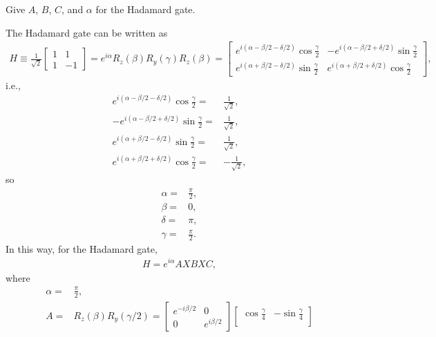 \documentclass[en]{sol-man}
\begin{document}
\begin{exe}
    Give $A$, $B$, $C$, and $\alpha$ for the Hadamard gate.
\end{exe}
\begin{sol}
    The Hadamard gate can be written as
    \begin{align}
        H\equiv\frac{1}{\sqrt{2}}\begin{bmatrix}
            1&1\\
            1&-1
        \end{bmatrix}=e^{i\alpha}R_z(\beta)R_y(\gamma)R_z(\beta)=\begin{bmatrix}
            e^{i(\alpha-\beta/2-\delta/2)}\cos\frac{\gamma}{2}&-e^{i(\alpha-\beta/2+\delta/2)}\sin\frac{\gamma}{2}\\
            e^{i(\alpha+\beta/2-\delta/2)}\sin\frac{\gamma}{2}&e^{i(\alpha+\beta/2+\delta/2)}\cos\frac{\gamma}{2}
        \end{bmatrix},
    \end{align}
    i.e.,
    \begin{align}
        e^{i(\alpha-\beta/2-\delta/2)}\cos\frac{\gamma}{2}=&\frac{1}{\sqrt{2}},\\
        -e^{i(\alpha-\beta/2+\delta/2)}\sin\frac{\gamma}{2}=&\frac{1}{\sqrt{2}},\\
        e^{i(\alpha+\beta/2-\delta/2)}\sin\frac{\gamma}{2}=&\frac{1}{\sqrt{2}},\\
        e^{i(\alpha+\beta/2+\delta/2)}\cos\frac{\gamma}{2}=&-\frac{1}{\sqrt{2}},
    \end{align}
    so
    \begin{align}
        \alpha=&\frac{\pi}{2},\\
        \beta=&0,\\
        \delta=&\pi,\\
        \gamma=&\frac{\pi}{2}.
    \end{align}
    In this way, for the Hadamard gate,
    \begin{align}
        H=e^{i\alpha}AXBXC,
    \end{align}
    where
    \begin{align}
        \alpha=&\frac{\pi}{2},\\
        A=&R_z(\beta)R_y(\gamma/2)=\begin{bmatrix}
            e^{-i\beta/2}&0\\
            0&e^{i\beta/2}
        \end{bmatrix}\begin{bmatrix}
            \cos\frac{\gamma}{4}&-\sin\frac{\gamma}{4}\\

\end{bmatrix}
\end{align}
\end{sol}
\end{document}
